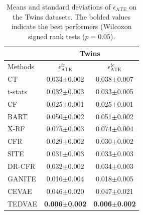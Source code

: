 \documentclass[letterpaper]{article} %
\begin{document}
\begin{table}[!t]
	\setlength{\tabcolsep}{4pt}
	\centering
	\begin{tabular}{l | c c}
		\hline
		&   \multicolumn{2}{c}{Twins} \\
		\hline
		Methods & $\epsilon_{\text{ATE}}^{tr}$ &  $\epsilon_{\text{ATE}}^{te}$  \\
		\hline
		CT &   0.034$\pm$0.002 & 0.038$\pm$0.007  \\
		t-stats & 0.032$\pm$0.003 & 0.033$\pm$0.005\\
		\hline
		CF	 & 0.025$\pm$0.001 & 0.025$\pm$0.001 \\
		BART  & 0.050$\pm$0.002 & 0.051$\pm$0.002\\
		X-RF   & 0.075$\pm$0.003 & 0.074$\pm$0.004 \\
		\hline
		CFR	    & 0.029$\pm$0.002 & 0.030$\pm$0.002\\
		
		SITE  & 0.031$\pm$0.003 & 0.033$\pm$0.003 \\ 
		DR-CFR & 0.032$\pm$0.002 & 0.034$\pm$0.003 \\
		\hline
		GANITE & 0.016$\pm$0.004 & 0.018$\pm$0.005 \\
		CEVAE   & 0.046$\pm$0.020 & 0.047$\pm$0.021 \\
		TEDVAE  & \textbf{0.006$\pm$0.002}  & \textbf{0.006$\pm$0.002} \\
		\hline
	\end{tabular}
	\label{ATE_results}
	\caption{ Means and standard deviations of $\epsilon_{\text{ATE}}$ on the Twins datasets. The bolded values indicate the best performers (Wilcoxon signed rank tests ($p=0.05$). }	
\end{table}
\end{document}
